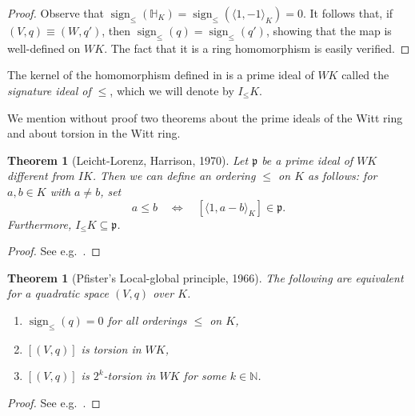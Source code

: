 \documentclass[12pt, leqno, british]{amsart}
\theoremstyle{definition}
\theoremstyle{plain}
\newtheorem{thm}[defi]{Theorem}
\theoremstyle{remark}
\newcommand{\mf}{\mathfrak}
\newcommand{\mbb}{\mathbb}
\newcommand{\nat}{\mbb N}
\DeclareMathOperator{\sign}{sign}
\begin{document}
\begin{proof}
Observe that $\sign_\leq(\mbb{H}_K) = \sign_\leq(\langle 1, -1 \rangle_K) = 0$.
It follows that, if $(V, q) \equiv (W, q')$, then $\sign_{\leq}(q) = \sign_\leq(q')$, showing that the map is well-defined on $WK$.
The fact that it is a ring homomorphism is easily verified.
\end{proof}
The kernel of the homomorphism defined in  is a prime ideal of $WK$ called the \emph{signature ideal of $\leq$}, which we will denote by $I_\leq K$.

We mention without proof two theorems about the prime ideals of the Witt ring and about torsion in the Witt ring.
\begin{thm}[Leicht-Lorenz, Harrison, 1970]
Let $\mf{p}$ be a prime ideal of $WK$ different from $IK$.
Then we can define an ordering $\leq$ on $K$ as follows: for $a, b \in K$ with $a \neq b$, set
$$ a \leq b \quad\Leftrightarrow\quad [\langle 1, a - b \rangle_K] \in \mf{p}.$$
Furthermore, $I_{\leq}K \subseteq \mf{p}$.
\end{thm}
\begin{proof}
See e.g.~\autocite[Theorem 31.24]{ElmanKarpenkoMerkurjev}.
\end{proof}
\begin{thm}[Pfister's Local-global principle, 1966]\label{T:Pfisters-LGP}
The following are equivalent for a quadratic space $(V, q)$ over $K$.
\begin{enumerate}
\item $\sign_\leq(q) = 0$ for all orderings $\leq$ on $K$,
\item $[(V, q)]$ is torsion in $WK$,
\item $[(V, q)]$ is $2^k$-torsion in $WK$ for some $k \in \nat$.
\end{enumerate}
\end{thm}
\begin{proof}
See e.g.~\autocite[Theorem VIII.3.2]{Lam}.
\end{proof}
\end{document}
